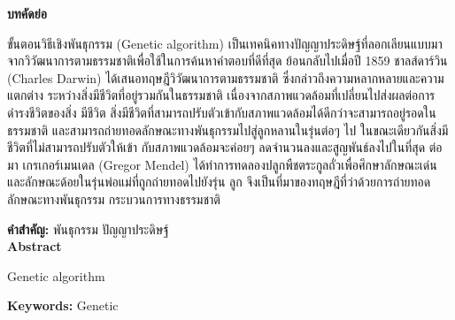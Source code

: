 \newpage
\thispagestyle{empty}
\vspace{2 cm}
{\huge \bf บทคัดย่อ}

\vspace{2 cm}
ขั้นตอนวิธีเชิงพันธุกรรม (Genetic algorithm)  เป็นเทคนิคทางปัญญาประดิษฐ์ที่ลอกเลียนแบบมา
จากวิวัฒนาการตามธรรมชาติเพื่อใช้ในการค้นหาคำตอบที่ดีที่สุด ย้อนกลับไปเมื่อปี 1859 ชาลส์ดาร์วิน
(Charles Darwin) ได้เสนอทฤษฎีวิวัฒนาการตามธรรมชาติ ซึ่งกล่าวถึงความหลากหลายและความแตกต่าง
ระหว่างสิ่งมีชีวิตที่อยู่รวมกันในธรรมชาติ เนื่องจากสภาพแวดล้อมที่เปลี่ยนไปส่งผลต่อการดำรงชีวิตของสิ่ง
มีชีวิต  สิ่งมีชีวิตที่สามารถปรับตัวเข้ากับสภาพแวดล้อมได้ดีกว่าจะสามารถอยู่รอดในธรรมชาติ และสามารถถ่ายทอดลักษณะทางพันธุกรรมไปสู่ลูกหลานในรุ่นต่อๆ ไป ในขณะเดียวกันสิ่งมีชีวิตที่ไม่สามารถปรับตัวให้เข้า
กับสภาพแวดล้อมจะค่อยๆ ลดจำนวนลงและสูญพันธ์ลงไปในที่สุด ต่อมา เกรเกอร์เมนเดล (Gregor Mendel)
ได้ทำการทดลองปลูกพืชตระกูลถั่วเพื่อศึกษาลักษณะเด่นและลักษณะด้อยในรุ่นพ่อแม่ที่ถูกถ่ายทอดไปยังรุ่น
ลูก จึงเป็นที่มาของทฤษฎีที่ว่าด้วยการถ่ายทอดลักษณะทางพันธุกรรม กระบวนการทางธรรมชาติ

\vspace{1 cm}
{\bf{คำสำคัญ:}} พันธุกรรม ปัญญาประดิษฐ์\\

\newpage
\thispagestyle{empty}
\vspace{2 cm}
{\huge \bf Abstract}

\vspace{2 cm}
Genetic algorithm

\vspace{1 cm}
{\bf{Keywords:}} Genetic \\